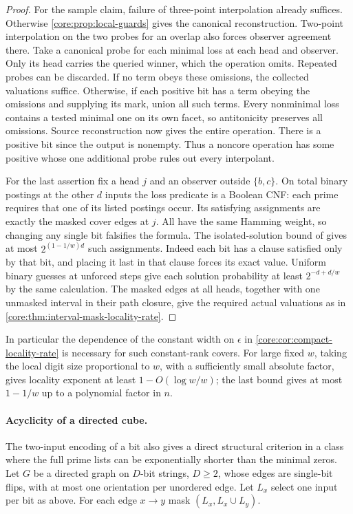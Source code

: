 \begin{proof}
For the sample claim, failure of three-point interpolation already
suffices. Otherwise \cref{core:prop:local-guards} gives the canonical
reconstruction. Two-point interpolation on the two probes for an
overlap also forces observer agreement there. Take a canonical probe
for each minimal loss at each head and observer. Only its head
carries the queried winner, which the operation omits. Repeated
probes can be discarded. If no term obeys these omissions, the
collected valuations suffice. Otherwise, if each positive bit has
a term obeying the omissions and supplying its mark, union all such
terms. Every nonminimal loss contains a tested minimal one on its
own facet, so antitonicity preserves all omissions. Source
reconstruction now gives the entire operation. There is a positive
bit since the output is nonempty. Thus a noncore operation has some
positive whose one additional probe rules out every interpolant.

For the last assertion fix a head $j$ and an observer outside
$\{b,c\}$. On total binary postings at the other $d$ inputs the
loss predicate is a Boolean CNF: each prime requires that one of
its listed postings occur. Its satisfying assignments are exactly
the masked cover edges at $j$. All have the same Hamming weight,
so changing any single bit falsifies the formula. The isolated-solution
bound of \cite{PaturiPudlakZane1999} gives at most $2^{(1-1/w)d}$
such assignments. Indeed each bit has a clause satisfied only by
that bit, and placing it last in that clause forces its exact value.
Uniform binary guesses at unforced steps give each solution
probability at least $2^{-d+d/w}$ by the same calculation.
The masked edges at all heads, together with one unmasked interval
in their path closure, give the required actual valuations as in
\cref{core:thm:interval-mask-locality-rate}.
\end{proof}

In particular the dependence of the constant width on $\epsilon$
in \cref{core:cor:compact-locality-rate} is necessary for such
constant-rank covers. For large fixed $w$, taking the local digit
size proportional to $w$, with a sufficiently small absolute
factor, gives locality exponent at least $1-O(\log w/w)$; the last
bound gives at most $1-1/w$ up to a polynomial factor in $n$.

\paragraph{Acyclicity of a directed cube.}
The two-input encoding of a bit also gives a direct structural
criterion in a class where the full prime lists can be exponentially
shorter than the minimal zeros. Let $G$ be a directed graph on
$D$-bit strings, $D\ge2$, whose edges are single-bit flips, with at
most one orientation per unordered edge. Let $L_x$ select one input
per bit as above. For each edge $x\to y$ mask
$(L_x,L_x\cup L_y)$.

